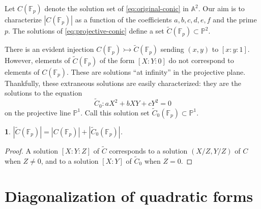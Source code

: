 \documentclass[10pt,a4paper]{amsart}
\numberwithin{equation}{section}
\numberwithin{figure}{section}
\theoremstyle{definition}
\theoremstyle{remark}
\theoremstyle{plain}
\theoremstyle{plain}
\theoremstyle{definition}
\theoremstyle{plain}
\theoremstyle{plain}
\newtheorem{lem}{\protect\lemmaname}[section]
\providecommand{\lemmaname}{Lemma}
\newcommand{\A}{\mathbb{A}}
\renewcommand{\P}{\mathbb{P}}
\newcommand{\F}{\mathbb{F}}
\begin{document}
    Let $C(\F_p)$ denote the solution set of \eqref{eq:original-conic} in $\A^2$. Our aim
    is to characterize $|C(\F_p)|$ as a function of the coefficients $a,b,c,d,e,f$ and 
    the prime $p$. The solutions of \eqref{eq:projective-conic} define a set
    $\widetilde{C}(\F_p) \subset \P^2$.

    There is an evident injection $C(\F_p) \rightarrowtail \widetilde{C}(\F_p)$ sending $(x,y)$ to
    $[x:y:1]$. However, elements of $\widetilde{C}(\F_p)$ of the form $[X:Y:0]$ do not 
    correspond to elements of $C(\F_p)$. 
    These are solutions ``at infinity'' in the projective plane.
    Thankfully, these extraneous solutions are easily characterized: they are the
    solutions to the equation
    \begin{equation}\label{eq:projective-conic-at-infinity} 
        \widetilde{C}_0 \colon aX^2 + bXY + cY^2 = 0
    \end{equation} 
    on the projective line $\P^1$. Call this solution set $\widetilde{C}_0(\F_p)\subset \P^1$.  

    \begin{lem} 
        $|\widetilde{C}(\F_p)| = |C(\F_p)| + |\widetilde{C}_0(\F_p)|$.
    \end{lem} 
    \begin{proof}
        A solution $[X:Y:Z]$ of $\widetilde{C}$ corresponds 
        to a solution $(X/Z,Y/Z)$ of $C$ when $Z \neq 0$,
        and to a solution $[X:Y]$ of $\widetilde{C}_0$ 
        when $Z = 0$.  
    \end{proof}

    \section{Diagonalization of quadratic forms}
    \label{sec:diagonalizing-quadratic-forms} 
\end{document}

